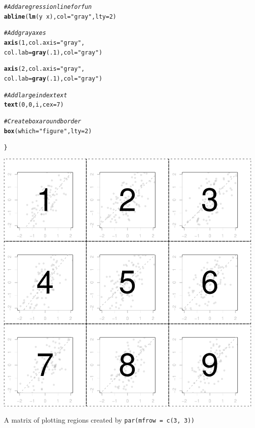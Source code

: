 \documentclass{tufte-book}\usepackage[]{graphicx}\usepackage[]{color}
\makeatletter
\def\maxwidth{ %
  \ifdim\Gin@nat@width>\linewidth
    \linewidth
  \else
    \Gin@nat@width
  \fi
}
\newcommand{\hlnum}[1]{\textcolor[rgb]{0.686,0.059,0.569}{#1}}%
\newcommand{\hlstr}[1]{\textcolor[rgb]{0.192,0.494,0.8}{#1}}%
\newcommand{\hlcom}[1]{\textcolor[rgb]{0.678,0.584,0.686}{\textit{#1}}}%
\newcommand{\hlopt}[1]{\textcolor[rgb]{0,0,0}{#1}}%
\newcommand{\hlstd}[1]{\textcolor[rgb]{0.345,0.345,0.345}{#1}}%
\newcommand{\hlkwc}[1]{\textcolor[rgb]{0.333,0.667,0.333}{#1}}%
\newcommand{\hlkwd}[1]{\textcolor[rgb]{0.737,0.353,0.396}{\textbf{#1}}}%
\newenvironment{kframe}{%
 \def\at@end@of@kframe{}%
 \ifinner\ifhmode%
  \def\at@end@of@kframe{\end{minipage}}%
  \begin{minipage}{\columnwidth}%
 \fi\fi%
 \def\FrameCommand##1{\hskip\@totalleftmargin \hskip-\fboxsep
 \colorbox{shadecolor}{##1}\hskip-\fboxsep
     \hskip-\linewidth \hskip-\@totalleftmargin \hskip\columnwidth}%
 \MakeFramed {\advance\hsize-\width
   \@totalleftmargin\z@ \linewidth\hsize
   \@setminipage}}%
 {\par\unskip\endMakeFramed%
 \at@end@of@kframe}
\newenvironment{knitrout}{}{} %
\makeatother
\begin{document}
\begin{footnotesize}
\begin{marginfigure}
\begin{tiny}
\begin{knitrout}
\begin{kframe}
\begin{alltt}
\hlcom{# Add a regression line for fun}
\hlkwd{abline}\hlstd{(}\hlkwd{lm}\hlstd{(y} \hlopt{~} \hlstd{x),} \hlkwc{col} \hlstd{=} \hlstr{"gray"}\hlstd{,} \hlkwc{lty} \hlstd{=} \hlnum{2}\hlstd{)}


\hlcom{# Add gray axes}
\hlkwd{axis}\hlstd{(}\hlnum{1}\hlstd{,} \hlkwc{col.axis} \hlstd{=} \hlstr{"gray"}\hlstd{,}
     \hlkwc{col.lab} \hlstd{=} \hlkwd{gray}\hlstd{(}\hlnum{.1}\hlstd{),} \hlkwc{col} \hlstd{=} \hlstr{"gray"}\hlstd{)}

\hlkwd{axis}\hlstd{(}\hlnum{2}\hlstd{,} \hlkwc{col.axis} \hlstd{=} \hlstr{"gray"}\hlstd{,}
     \hlkwc{col.lab} \hlstd{=} \hlkwd{gray}\hlstd{(}\hlnum{.1}\hlstd{),} \hlkwc{col} \hlstd{=} \hlstr{"gray"}\hlstd{)}

\hlcom{# Add large index text}
\hlkwd{text}\hlstd{(}\hlnum{0}\hlstd{,} \hlnum{0}\hlstd{, i,} \hlkwc{cex} \hlstd{=} \hlnum{7}\hlstd{)}

\hlcom{# Create box around border}
\hlkwd{box}\hlstd{(}\hlkwc{which} \hlstd{=} \hlstr{"figure"}\hlstd{,} \hlkwc{lty} \hlstd{=} \hlnum{2}\hlstd{)}

\hlstd{\}}
\end{alltt}
\end{kframe}
\includegraphics[width=\maxwidth]{figure/unnamed-chunk-184-1} 

\end{knitrout}
\end{tiny}
\caption{A matrix of plotting regions created by \texttt{par(mfrow = c(3, 3))}}
\label{fig:mfrow}
\end{marginfigure}



\end{footnotesize}
\end{document}

